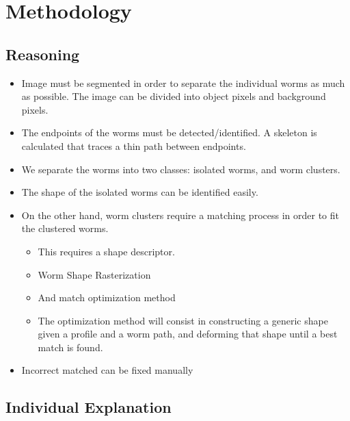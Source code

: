 \documentclass[12pt,letterpaper,oneside]{book}
\begin{document}
\section*{Methodology}

\subsection*{Reasoning}
\begin{itemize}
\item Image must be segmented in order to separate the individual
  worms as much as possible. The image can be divided into object
  pixels and background pixels.
\item The endpoints of the worms must be detected/identified. A skeleton
  is calculated that traces a thin path between endpoints.
\item We separate the worms into two classes: isolated worms, and 
  worm clusters.
\item The shape of the isolated worms can be identified easily.
\item On the other hand, worm clusters require a matching process
  in order to fit the clustered worms.
  \begin{itemize}
  \item This requires a shape descriptor. 
  \item Worm Shape Rasterization
  \item And match optimization method
    \item The optimization method will consist in constructing a generic
      shape given a profile and a worm path, and deforming that shape
      until a best match is found.
  \end{itemize}
\item Incorrect matched can be fixed manually

\end{itemize}

\subsection*{Individual Explanation}
\end{document}

